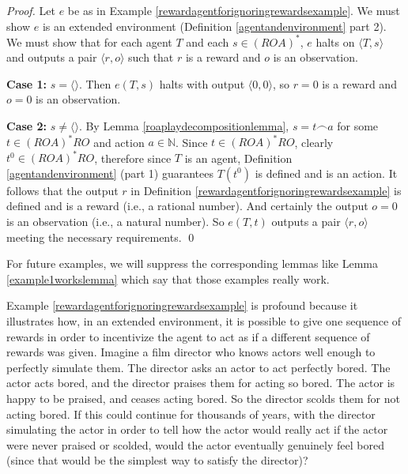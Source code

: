 \documentclass[runningheads]{llncs}
\begin{document}
\begin{proof}
    Let $e$ be as in
    Example \ref{rewardagentforignoringrewardsexample}.
    We must show $e$ is an extended environment (Definition \ref{agentandenvironment}
    part 2). We must show that for each agent $T$ and each $s\in (ROA)^*$,
    $e$ halts on $\langle T,s\rangle$ and outputs a pair $\langle r,o\rangle$
    such that $r$ is a reward and $o$ is an observation.

    \textbf{Case 1:} $s=\langle\rangle$. Then $e(T,s)$ halts with output
    $\langle 0,0\rangle$, so $r=0$ is a reward and $o=0$ is an observation.

    \textbf{Case 2:} $s\not=\langle\rangle$. By Lemma \ref{roaplaydecompositionlemma},
    $s=t\frown a$ for some $t\in (ROA)^*RO$ and action $a\in\mathbb N$.
    Since $t\in (ROA)^*RO$, clearly $t^0\in (ROA)^*RO$, therefore
    since $T$ is an agent, Definition \ref{agentandenvironment} (part 1)
    guarantees $T(t^0)$ is defined and is an action. It follows that the output
    $r$ in Definition \ref{rewardagentforignoringrewardsexample} is defined and is
    a reward (i.e., a rational number). And certainly the output $o=0$ is an
    observation (i.e., a natural number).
    So $e(T,t)$ outputs a pair $\langle r,o\rangle$ meeting the necessary
    requirements.
    \qed
\end{proof}

For future examples, we will suppress the corresponding lemmas like
Lemma \ref{example1workslemma} which say that those examples really work.

Example \ref{rewardagentforignoringrewardsexample} is profound because it illustrates how,
in an extended environment, it is possible to give one sequence of rewards
in order to incentivize the agent to act as if a different sequence of rewards was given.
Imagine a film director who knows actors well enough to perfectly simulate them.
The director asks an actor to act perfectly bored.
The actor acts bored, and the director praises them for acting so bored.
The actor is happy to be praised, and ceases acting bored. So the director scolds
them for not acting bored. If this could continue for thousands of years, with the
director simulating the actor in order to tell how the actor would really act if
the actor were never praised or scolded, would the actor eventually genuinely
feel bored (since that would be the simplest way to satisfy the director)?
\end{document}
